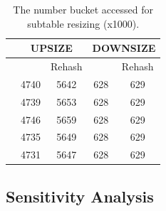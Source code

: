 

\begin{table}[b]
	\centering
	\caption{The number bucket accessed for subtable resizing (x1000).}
	\vspace{-1em}
	\label{tab:buckets}
	\begin{tabular}{|c|c|c|c|c|}
		\hline  
		& \multicolumn{2}{c|}{UPSIZE} & \multicolumn{2}{c|}{DOWNSIZE} \\ \hline
		& \voter & Rehash & \voter & Rehash \\ \hline
		\dstwitter & 4740 & 5642 & 628 & 629 \\ \hline
		\dsreddit & 4739 & 5653 & 628 & 629 \\ \hline
		\dstpch& 4746 &  5659 & 628 & 629\\ \hline
		\dsali & 4735 & 5649 & 628 & 629 \\ \hline
		\dsrandom & 4731 & 5647 & 628 & 629 \\ \hline
	\end{tabular}
\end{table}

\subsection{Sensitivity Analysis}\label{sec:exp:tune}

